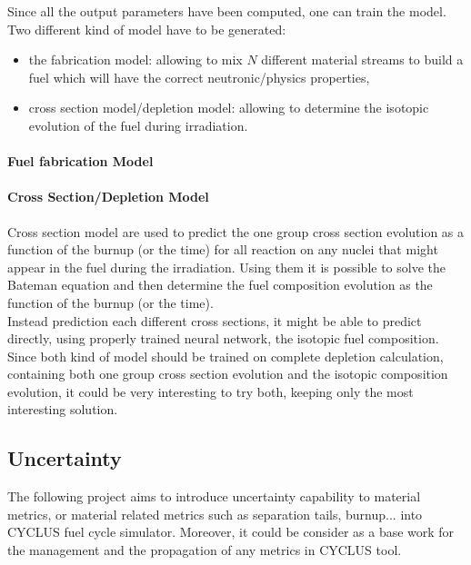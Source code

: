 \documentclass[dvips,12pt]{article}
\begin{document}
Since all the output parameters have been computed, one can train the model. Two different kind of model have to be generated: 
\begin{itemize}
\item the fabrication model: allowing to mix $N$ different material streams to build a fuel which will have the correct neutronic/physics properties,
\item cross section model/depletion model: allowing to determine the isotopic evolution of the fuel during irradiation.
\end{itemize}

\paragraph{Fuel fabrication Model\\}	



\paragraph{Cross Section/Depletion Model\\}
Cross section model are used to predict the one group cross section evolution as a function of the burnup (or the time) for all reaction on any nuclei that might appear in the fuel during the irradiation.
Using them it is possible to solve the Bateman equation and then determine the fuel composition evolution as the function of the burnup (or the time).\\
Instead prediction each different cross sections, it might be able to predict directly, using properly trained neural network, the isotopic fuel composition.\\
Since both kind of model should be trained on complete depletion calculation, containing both one group cross section evolution and the isotopic composition evolution, it could be very interesting to try both, keeping only the most interesting solution.



\subsection{Uncertainty}
The following project aims to introduce uncertainty capability to material metrics, or material related metrics such as separation tails, burnup...  into CYCLUS fuel cycle simulator. Moreover, it could be consider as a base work for the management and the propagation of any metrics in CYCLUS tool.
\end{document}

